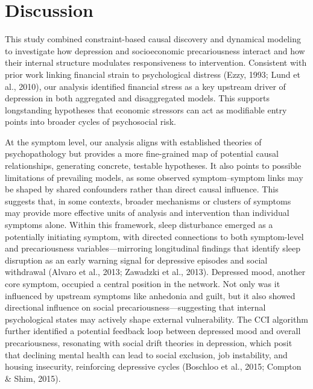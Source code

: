 \documentclass[
]{article}
\begin{document}
\restoregeometry

\section{Discussion}\label{discussion}

This study combined constraint-based causal discovery and dynamical
modeling to investigate how depression and socioeconomic precariousness
interact and how their internal structure modulates responsiveness to
intervention. Consistent with prior work linking financial strain to
psychological distress (Ezzy, 1993; Lund et al., 2010), our analysis
identified financial stress as a key upstream driver of depression in
both aggregated and disaggregated models. This supports longstanding
hypotheses that economic stressors can act as modifiable entry points
into broader cycles of psychosocial risk.

At the symptom level, our analysis aligns with established theories of
psychopathology but provides a more fine-grained map of potential causal
relationships, generating concrete, testable hypotheses. It also points
to possible limitations of prevailing models, as some observed
symptom--symptom links may be shaped by shared confounders rather than
direct causal influence. This suggests that, in some contexts, broader
mechanisms or clusters of symptoms may provide more effective units of
analysis and intervention than individual symptoms alone. Within this
framework, sleep disturbance emerged as a potentially initiating
symptom, with directed connections to both symptom-level and
precariousness variables---mirroring longitudinal findings that identify
sleep disruption as an early warning signal for depressive episodes and
social withdrawal (Alvaro et al., 2013; Zawadzki et al., 2013).
Depressed mood, another core symptom, occupied a central position in the
network. Not only was it influenced by upstream symptoms like anhedonia
and guilt, but it also showed directional influence on social
precariousness---suggesting that internal psychological states may
actively shape external vulnerability. The CCI algorithm further
identified a potential feedback loop between depressed mood and overall
precariousness, resonating with social drift theories in depression,
which posit that declining mental health can lead to social exclusion,
job instability, and housing insecurity, reinforcing depressive cycles
(Boschloo et al., 2015; Compton \& Shim, 2015).
\end{document}
